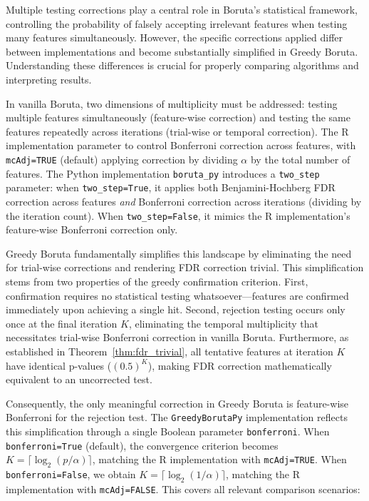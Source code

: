 \documentclass[runningheads]{llncs}
\begin{document}
Multiple testing corrections play a central role in Boruta's statistical framework, controlling the probability of falsely accepting irrelevant features when testing many features simultaneously. However, the specific corrections applied differ between implementations and become substantially simplified in Greedy Boruta. Understanding these differences is crucial for properly comparing algorithms and interpreting results.

In vanilla Boruta, two dimensions of multiplicity must be addressed: testing multiple features simultaneously (feature-wise correction) and testing the same features repeatedly across iterations (trial-wise or temporal correction). The R implementation parameter to control Bonferroni correction across features, with \texttt{mcAdj=TRUE} (default) applying correction by dividing $\alpha$ by the total number of features. The Python implementation \texttt{boruta\_py} introduces a \texttt{two\_step} parameter: when \texttt{two\_step=True}, it applies both Benjamini-Hochberg FDR correction across features \emph{and} Bonferroni correction across iterations (dividing by the iteration count). When \texttt{two\_step=False}, it mimics the R implementation's feature-wise Bonferroni correction only.

Greedy Boruta fundamentally simplifies this landscape by eliminating the need for trial-wise corrections and rendering FDR correction trivial. This simplification stems from two properties of the greedy confirmation criterion. First, confirmation requires no statistical testing whatsoever---features are confirmed immediately upon achieving a single hit. Second, rejection testing occurs only once at the final iteration $K$, eliminating the temporal multiplicity that necessitates trial-wise Bonferroni correction in vanilla Boruta. Furthermore, as established in Theorem~\ref{thm:fdr_trivial}, all tentative features at iteration $K$ have identical p-values ($(0.5)^K$), making FDR correction mathematically equivalent to an uncorrected test.

Consequently, the only meaningful correction in Greedy Boruta is feature-wise Bonferroni for the rejection test. The \texttt{GreedyBorutaPy} implementation reflects this simplification through a single Boolean parameter \texttt{bonferroni}. When \texttt{bonferroni=True} (default), the convergence criterion becomes $K = \lceil \log_2(p/\alpha) \rceil$, matching the R implementation with \texttt{mcAdj=TRUE}. When \texttt{bonferroni=False}, we obtain $K = \lceil \log_2(1/\alpha) \rceil$, matching the R implementation with \texttt{mcAdj=FALSE}. This covers all relevant comparison scenarios:
\end{document}
